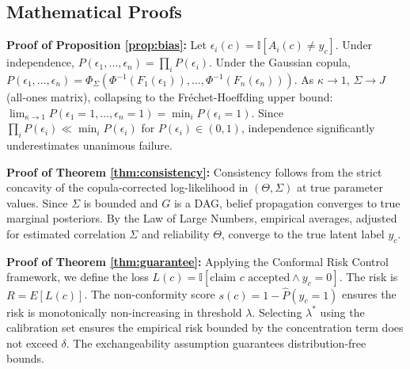 \documentclass[conference]{IEEEtran}
\begin{document}
\subsection{Mathematical Proofs}
\label{app:proofs}

\textbf{Proof of Proposition \ref{prop:bias}:} Let $\epsilon_i(c) = \mathbb{I}[A_i(c) \neq y_c]$. Under independence, $P(\epsilon_1, \dots, \epsilon_n) = \prod_i P(\epsilon_i)$. Under the Gaussian copula, $P(\epsilon_1, \dots, \epsilon_n) = \Phi_\Sigma(\Phi^{-1}(F_1(\epsilon_1)), \dots, \Phi^{-1}(F_n(\epsilon_n)))$. As $\kappa \to 1$, $\Sigma \to J$ (all-ones matrix), collapsing to the Fréchet-Hoeffding upper bound: $\lim_{\kappa \to 1} P(\epsilon_1=1, \dots, \epsilon_n=1) = \min_i P(\epsilon_i = 1)$. Since $\prod_i P(\epsilon_i) \ll \min_i P(\epsilon_i)$ for $P(\epsilon_i) \in (0, 1)$, independence significantly underestimates unanimous failure.

\textbf{Proof of Theorem \ref{thm:consistency}:} Consistency follows from the strict concavity of the copula-corrected log-likelihood in $(\Theta, \Sigma)$ at true parameter values. Since $\Sigma$ is bounded and $G$ is a DAG, belief propagation converges to true marginal posteriors. By the Law of Large Numbers, empirical averages, adjusted for estimated correlation $\Sigma$ and reliability $\Theta$, converge to the true latent label $y_c$.

\textbf{Proof of Theorem \ref{thm:guarantee}:} Applying the Conformal Risk Control framework, we define the loss $L(c) = \mathbb{I}[\text{claim } c \text{ accepted} \land y_c = 0]$. The risk is $R = E[L(c)]$. The non-conformity score $s(c) = 1 - \hat{P}(y_c=1)$ ensures the risk is monotonically non-increasing in threshold $\lambda$. Selecting $\lambda^*$ using the calibration set ensures the empirical risk bounded by the concentration term does not exceed $\delta$. The exchangeability assumption guarantees distribution-free bounds.
\end{document}
